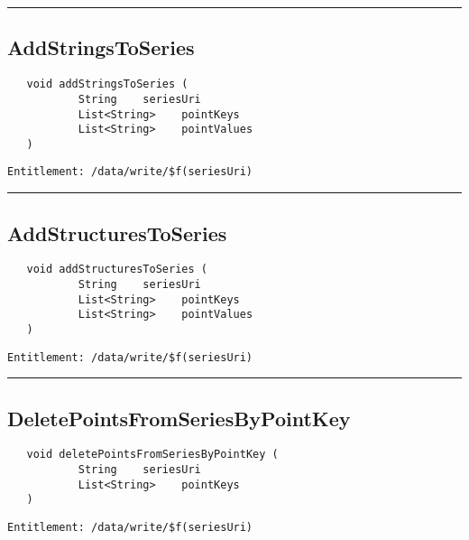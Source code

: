 \rule{12cm}{2pt}
\subsection{AddStringsToSeries}
\label{Api:AddStringsToSeries}
\begin{Verbatim}
   void addStringsToSeries (
           String    seriesUri
           List<String>    pointKeys
           List<String>    pointValues
   )
\end{Verbatim}
\begin{Verbatim}[formatcom=\color{Maroon}]
  Entitlement: /data/write/$f(seriesUri)
\end{Verbatim}



\rule{12cm}{2pt}
\subsection{AddStructuresToSeries}
\label{Api:AddStructuresToSeries}
\begin{Verbatim}
   void addStructuresToSeries (
           String    seriesUri
           List<String>    pointKeys
           List<String>    pointValues
   )
\end{Verbatim}
\begin{Verbatim}[formatcom=\color{Maroon}]
  Entitlement: /data/write/$f(seriesUri)
\end{Verbatim}



\rule{12cm}{2pt}
\subsection{DeletePointsFromSeriesByPointKey}
\label{Api:DeletePointsFromSeriesByPointKey}
\begin{Verbatim}
   void deletePointsFromSeriesByPointKey (
           String    seriesUri
           List<String>    pointKeys
   )
\end{Verbatim}
\begin{Verbatim}[formatcom=\color{Maroon}]
  Entitlement: /data/write/$f(seriesUri)
\end{Verbatim}



